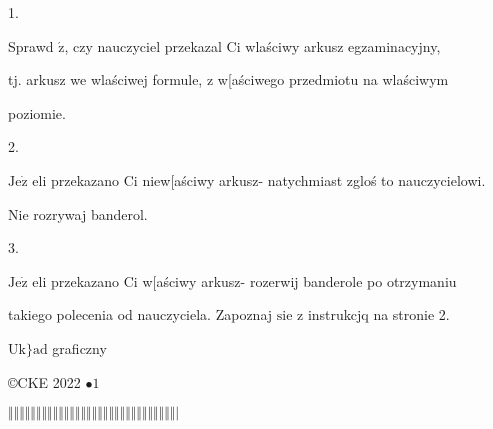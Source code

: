 \documentclass[a4paper,12pt]{article}
\begin{document}
1.

Sprawd $\acute{\mathrm{z}}$, czy nauczyciel przekazal Ci wlaściwy arkusz egzaminacyjny,

tj. arkusz we wlaściwej formule, z w[aściwego przedmiotu na wlaściwym

poziomie.

2.

$\mathrm{J}\mathrm{e}\dot{\mathrm{z}}$ eli przekazano Ci niew[aściwy arkusz- natychmiast zgloś to nauczycielowi.

Nie rozrywaj banderol.

3.

$\mathrm{J}\mathrm{e}\dot{\mathrm{z}}$ eli przekazano Ci w[aściwy arkusz- rozerwij banderole po otrzymaniu

takiego polecenia od nauczyciela. Zapoznaj $\mathrm{s}\mathrm{i}\mathrm{e}$ z instrukcjq na stronie 2.

$\mathrm{U}\mathrm{k}\}\mathrm{a}\mathrm{d}$ graficzny

\copyright CKE 2022 $\bullet 1$

$\Vert\Vert\Vert\Vert\Vert\Vert\Vert\Vert\Vert\Vert\Vert\Vert\Vert\Vert\Vert\Vert\Vert\Vert\Vert\Vert\Vert\Vert\Vert\Vert\Vert\Vert\Vert\Vert\Vert\Vert|$
\end{document}
